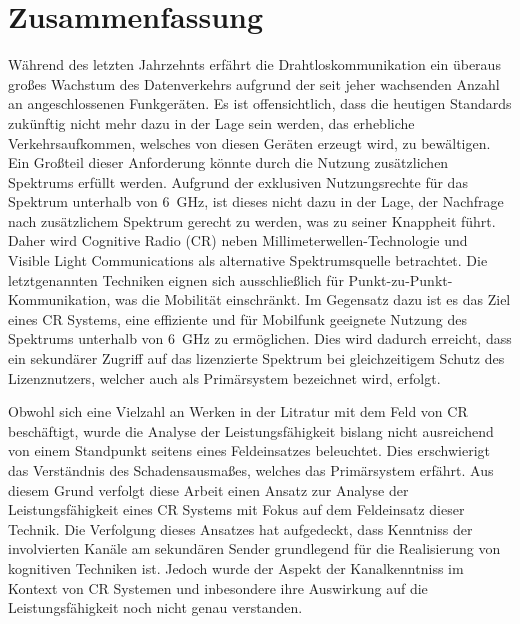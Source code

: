 \chapter*{Zusammenfassung}
W\"ahrend des letzten Jahrzehnts erf\"ahrt die Drahtloskommunikation ein \"uberaus gro\ss es Wachstum des Datenverkehrs aufgrund der seit jeher wachsenden Anzahl an angeschlossenen Funkger\"aten. Es ist offensichtlich, dass die heutigen Standards zuk\"unftig nicht mehr dazu in der Lage sein werden, das erhebliche Verkehrsaufkommen, welsches von diesen Ger\"aten erzeugt wird, zu bew\"altigen. Ein Gro\ss teil dieser Anforderung k\"onnte durch die Nutzung zus\"atzlichen Spektrums erf\"ullt werden. Aufgrund der exklusiven Nutzungsrechte f\"ur das Spektrum unterhalb von \SI{6}{GHz}, ist dieses nicht dazu in der Lage, der Nachfrage nach zus\"atzlichem Spektrum gerecht zu werden, was zu seiner Knappheit f\"uhrt. Daher wird Cognitive Radio (CR) neben Millimeterwellen-Technologie und Visible Light Communications als alternative Spektrumsquelle betrachtet. Die letztgenannten Techniken eignen sich ausschlie\ss lich f\"ur Punkt-zu-Punkt-Kommunikation, was die Mobilit\"at einschr\"ankt. Im Gegensatz dazu ist es das Ziel eines CR Systems, eine effiziente und f\"ur Mobilfunk geeignete Nutzung des Spektrums unterhalb von \SI{6}{GHz} zu erm\"oglichen. Dies wird dadurch erreicht, dass ein sekund\"arer Zugriff auf das lizenzierte Spektrum bei gleichzeitigem Schutz des Lizenznutzers, welcher auch als Prim\"arsystem bezeichnet wird, erfolgt. 

Obwohl sich eine Vielzahl an Werken in der Litratur mit dem Feld von CR beschäftigt, wurde die Analyse der Leistungsfähigkeit bislang nicht ausreichend von einem Standpunkt seitens eines Feldeinsatzes beleuchtet. Dies erschwierigt das Verständnis des Schadensausmaßes, welches das Primärsystem erfährt. Aus diesem Grund verfolgt diese Arbeit einen Ansatz zur Analyse der Leistungsfähigkeit eines CR Systems mit Fokus auf dem Feldeinsatz dieser Technik. Die Verfolgung dieses Ansatzes hat aufgedeckt, dass Kenntniss der involvierten Kanäle am sekundären Sender grundlegend für die Realisierung von kognitiven Techniken ist. Jedoch wurde der Aspekt der Kanalkenntniss im Kontext von CR Systemen und inbesondere ihre Auswirkung auf die Leistungsfähigkeit noch nicht genau verstanden. 

\cleardoublepage
